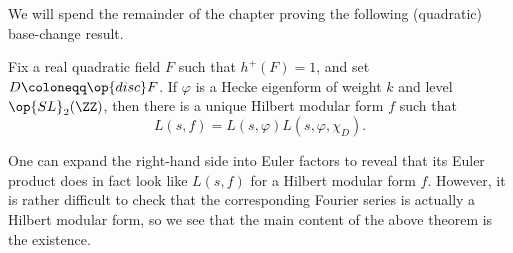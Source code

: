 \documentclass{article}
\begin{document}
We will spend the remainder of the chapter proving the following (quadratic) base-change result.
\begin{theorem}
	Fix a real quadratic field $F$ such that $h^+(F)=1$, and set $D\coloneqq\op{disc}F$. If $\varphi$ is a Hecke eigenform of weight $k$ and level $\op{SL}_2(\ZZ)$, then there is a unique Hilbert modular form $f$ such that
	\[L(s,f)=L(s,\varphi)L(s,\varphi,\chi_D).\]
\end{theorem}
\begin{remark}
	One can expand the right-hand side into Euler factors to reveal that its Euler product does in fact look like $L(s,f)$ for a Hilbert modular form $f$. However, it is rather difficult to check that the corresponding Fourier series is actually a Hilbert modular form, so we see that the main content of the above theorem is the existence.
\end{remark}
\end{document}
